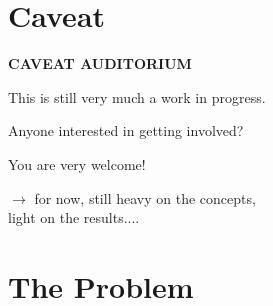 \documentclass[xcolor=dvipsnames]{beamer}
\begin{document}
 


%

\section{Caveat}

\begin{frame}
  \begin{center}
    \textbf{\Huge CAVEAT AUDITORIUM}

    \vspace{10mm}

    This is still very much a work in progress.

    \vspace{10mm}
    Anyone interested in getting involved?  

    You are very welcome!
  \end{center}

  \vfill

  $\rightarrow$ for now, still heavy on the concepts, \\light on the results....
\end{frame}

\section{The Problem}

\begin{frame}
\end{frame}
\end{document}
